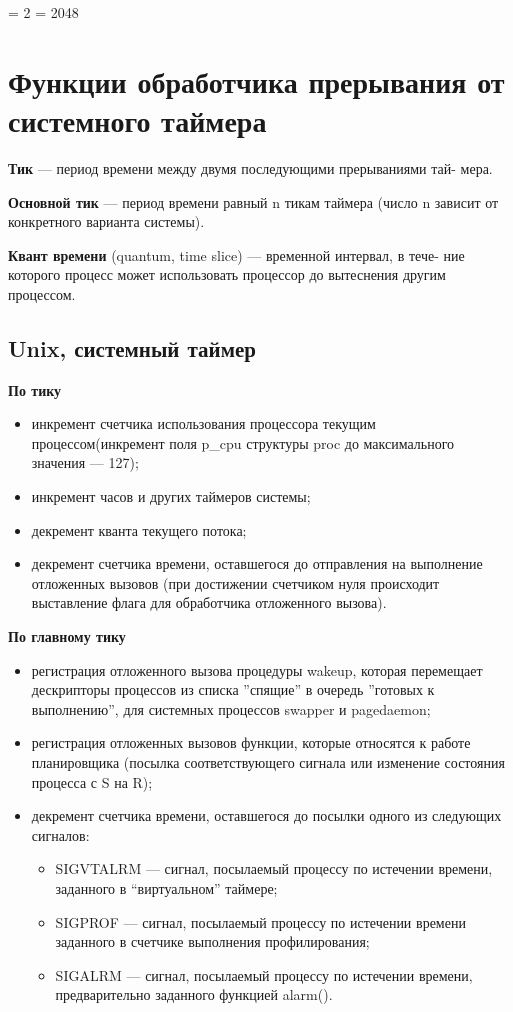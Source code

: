 \documentclass[a4paper,14pt,russian]{extreport}
\begin{document}
    \righthyphenmin = 2
    \tolerance = 2048
    
    
    \chapter{Функции обработчика прерывания от системного таймера}    
     
    \textbf{Тик} --- период времени между двумя последующими прерываниями тай-
    мера.
    
    \textbf{Основной тик} --- период времени равный n тикам таймера (число n
    зависит от конкретного варианта системы).
    
    \textbf{Квант времени} (quantum, time slice) --- временной интервал, в тече-
    ние которого процесс может использовать процессор до вытеснения другим
    процессом.

    \section{Unix, системный таймер}
    \textbf{По тику}
    \begin{itemize}
    	\item инкремент счетчика использования процессора текущим процессом(инкремент поля p\_cpu структуры proc до максимального значения --- 127);
    	\item инкремент часов и других таймеров системы;
    	\item декремент кванта текущего потока;
    	\item декремент счетчика времени, оставшегося до отправления на выполнение отложенных вызовов (при достижении счетчиком нуля происходит выставление флага для обработчика отложенного вызова).
    \end{itemize}

	\textbf{По главному тику}
	\begin{itemize}
		\item регистрация отложенного вызова процедуры wakeup, которая перемещает дескрипторы процессов из списка ”спящие” в очередь ”готовых к выполнению”, для системных процессов swapper и pagedaemon;
		\item регистрация отложенных вызовов функции, которые относятся к работе планировщика (посылка соответствующего сигнала или изменение состояния процесса с S на R);
		\item декремент счетчика времени, оставшегося до посылки одного из следующих сигналов:
		\begin{itemize}
			\item SIGVTALRM --- сигнал, посылаемый процессу по истечении времени, заданного в “виртуальном” таймере;
			\item SIGPROF --- сигнал, посылаемый процессу по истечении времени заданного в счетчике выполнения профилирования;
			\item SIGALRM --- сигнал, посылаемый процессу по истечении времени, предварительно заданного функцией alarm().
		\end{itemize}
	\end{itemize}
\end{document}
